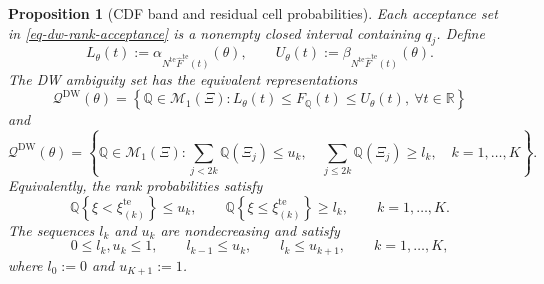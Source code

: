 \documentclass[review,11pt,3p,authoryear,nopreprintline]{elsarticle}
\newtheorem{proposition}{Proposition}
\begin{document}
\begin{proposition}[CDF band and residual cell probabilities]
  \label{prop-finite-rank-constraints}
  Each acceptance set in \eqref{eq-dw-rank-acceptance} is a nonempty closed interval containing $q_j$. Define
  \[
    L_\theta(t):=\alpha_{N^{\mathrm{te}}\widehat F^{\mathrm{te}}(t)}(\theta),
    \qquad
    U_\theta(t):=\beta_{N^{\mathrm{te}}\widehat F^{\mathrm{te}}(t)}(\theta).
  \]
  The DW ambiguity set has the equivalent representations
  \[
    \mathcal Q^{\mathrm{DW}}(\theta)
    =\left\{\mathbb Q\in\mathcal M_1(\Xi):
      L_\theta(t)\le F_{\mathbb Q}(t)\le U_\theta(t),\ \forall t\in\mathbb R\right\}
  \]
  and
  \begin{equation}
    \mathcal Q^{\mathrm{DW}}(\theta)
    =\left\{\mathbb Q\in\mathcal M_1(\Xi):
      \sum_{j<2k}\mathbb Q(\Xi_j)\le u_k,\quad
      \sum_{j\le2k}\mathbb Q(\Xi_j)\ge l_k,\quad k=1,\ldots,K\right\}.
    \label{eq-finite-rank-constraints}
  \end{equation}
  Equivalently, the rank probabilities satisfy
  \[
    \mathbb Q\left\{\xi<\xi_{(k)}^{\mathrm{te}}\right\}\le u_k,
    \qquad
    \mathbb Q\left\{\xi\le\xi_{(k)}^{\mathrm{te}}\right\}\ge l_k,
    \qquad k=1,\ldots,K.
  \]
  The sequences $l_k$ and $u_k$ are nondecreasing and satisfy
  \[
    0\le l_k,u_k\le1,\qquad l_{k-1}\le u_k,\qquad l_k\le u_{k+1},
    \qquad k=1,\ldots,K,
  \]
  where $l_0:=0$ and $u_{K+1}:=1$.
\end{proposition}
\end{document}
